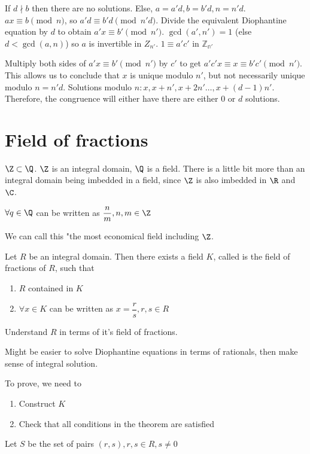 \documentclass[twoside, 10pt]{article}
\begin{document}
If $d \nmid b$ then there are no solutions. Else, $a = a'd, b = b'd, n = n'd$. $ax \equiv b \pmod{n}$, so $a'd \equiv b'd \pmod{n'd}$. Divide the equivalent Diophantine equation by $d$ to obtain $a'x \equiv b' \pmod{n'}$. $\gcd(a', n') = 1$ (else $d < \gcd(a, n)$) so $a$ is invertible in $Z_{n'}$. $1 \equiv a'c'$ in $\mathbb{Z_{n'}}$


Multiply both sides of $a'x \equiv b' \pmod{n'}$ by $c'$ to get $a'c'x \equiv x \equiv b'c' \pmod{n'}$. This allows us to conclude that $x$ is unique modulo $n'$, but not necessarily unique modulo $n = n'd$. Solutions modulo $n: x, x + n', x + 2n' \ldots, x + (d-1)n'$. Therefore, the congruence will either have there are either 0 or $d$ solutions.

\section{Field of fractions}
$\Z \subset \Q$. $\Z$ is an integral domain, $\Q$ is a field. There is a little bit more than an integral domain being imbedded in a field, since $\Z$ is also imbedded in $\R$ and $\C$. 

\begin{rmk}
    $\forall q\in \Q$ can be written as $\dfrac{n}{m}, n, m \in \Z$
\end{rmk}
We can call this "the most economical field including $\Z$.

\begin{thm}
    Let $R$ be an integral domain. Then there exists a field $K$, called is the field of fractions of $R$, such that 
    \begin{enumerate}
        \item $R$ contained in $K$
        \item $\forall x\in K$ can be written as $x = \dfrac{r}{s}, r , s\in R$
    \end{enumerate}
\end{thm}
Understand $R$ in terms of it's field of fractions. 

Might be easier to solve Diophantine equations in terms of rationals, then make sense of integral solution.

To prove, we need to 
\begin{enumerate}
    \item Construct $K$ 
    \item Check that all conditions in the theorem are satisfied
\end{enumerate}

Let $S$ be the set of pairs $(r, s), r, s \in R, s\neq 0$
\end{document}
